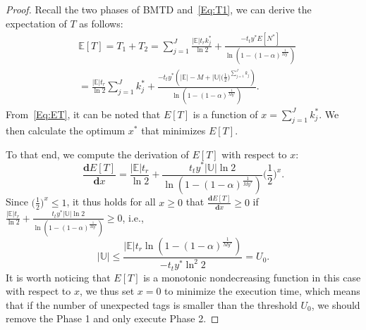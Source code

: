 \documentclass[10pt, twocolumn]{IEEEtran}
\begin{document}
\begin{proof}
Recall the two phases of BMTD and~\eqref{Eq:T1}, we can derive the expectation of $T$ as follows:
\begin{align}
&\mathbb{E}[T]
= T_1 + T_2
= \sum_{j=1}^{J} \frac{|\mathbb{E}| t_r k^*_j}{\ln 2} + \frac{-t_t y^* E[N^*]}{\ln (1- (1-\alpha)^{\frac{1}{M y^*}})} \nonumber\\
&= \frac{|\mathbb{E}| t_r}{\ln 2} \sum_{j=1}^{J} k^*_j
  + \frac{-t_t y^* \left(|\mathbb{E}|-M+|\mathbb{U}| \big(\frac{1}{2} \big)^{\sum_{j=1}^{J} k_j} \right)}{\ln (1- (1-\alpha)^{\frac{1}{M y^*}})}.
\label{Eq:ET}
\end{align}
From~\eqref{Eq:ET}, it can be noted that $E[T]$ is a function of $x=\sum_{j=1}^{J} k^*_j$. We then calculate the optimum $x^*$ that minimizes $E[T]$.
\begin{comment}
It is easy to check that
\begin{eqnarray*}
E[T]=
\begin{cases}
\sum_{j=1}^{J}l_j
+ \frac{ {(|\mathbb{E}|-M+|\mathbb{U}| \phi^{\frac{\sum_{j=1}^{J} l_j}{|\mathbb{E}|}})\ln (1-\alpha)}}{ -M \ln^2 2}, (1-\alpha) \le \frac{1}{2}^M \\
\sum_{j=1}^{J}l_j
+  \frac{(|\mathbb{E}|-M+|\mathbb{U}| \phi^{\frac{\sum_{j=1}^{J} l_j}{|\mathbb{E}|}})}{-\ln(1-(1-\alpha)^{1/M})},  (1-\alpha) > \frac{1}{2}^M
\end{cases}
\end{eqnarray*}
Let $x \triangleq \sum_{j=1}^{J}l_j$, we have
\begin{eqnarray}
E[T]=
\begin{cases}
x
+ \frac{ {(|\mathbb{E}|-M+|\mathbb{U}| \phi^{\frac{x}{|\mathbb{E}|}})\ln (1-\alpha)}}{ -M \ln^2 2}, & (1-\alpha) \le \frac{1}{2}^M \\
x
+  \frac{(|\mathbb{E}|-M+|\mathbb{U}| \phi^{\frac{x}{|\mathbb{E}|}})}{-\ln(1-(1-\alpha)^{1/M})}, & (1-\alpha) > \frac{1}{2}^M
\end{cases}
\end{eqnarray}
\end{comment}
To that end, we compute the derivation of $E[T]$ with respect to $x$:
\begin{equation}
\frac{\mathbf{d}E[T]}{\mathbf{d}x}
= \frac{|\mathbb{E}| t_r}{\ln 2}+ \frac{t_t y^* |\mathbb{U}|\ln2}{\ln(1-(1-\alpha)^{\frac{1}{M y^*}})} \big(\frac{1}{2}\big)^{x}.
\end{equation}
Since $\big(\frac{1}{2}\big)^{x} \le 1$, it thus holds for all $x \ge 0$ that $\frac{\mathbf{d}E[T]}{\mathbf{d}x} \ge 0$ if $\frac{|\mathbb{E}| t_r}{\ln 2}+ \frac{t_t y^* |\mathbb{U}|\ln2}{\ln(1-(1-\alpha)^{\frac{1}{M y^*}})} \ge 0$, i.e.,
\begin{equation}
|\mathbb{U}| \le \frac{|\mathbb{E}| t_r \ln(1-(1-\alpha)^{\frac{1}{M y^*}})}{-t_t y^* \ln^2 2}=U_0.
\end{equation}
It is worth noticing that $E[T]$ is a monotonic nondecreasing function in this case with respect to $x$, we thus set $x=0$ to minimize the execution time, which means that if the number of unexpected tags is smaller than the threshold $U_0$, we should remove the Phase 1 and only execute Phase 2.


\end{proof}
\end{document}
